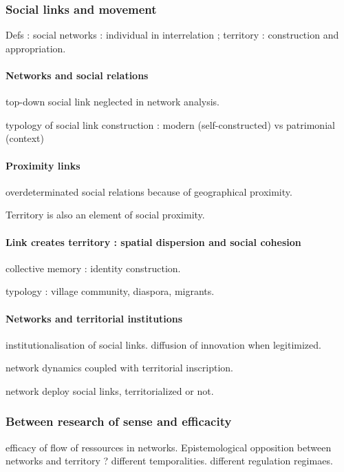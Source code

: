 \subsubsection*{Social links and movement}


Defs : social networks : individual in interrelation ; territory : construction and appropriation.

\paragraph{Networks and social relations}

top-down social link neglected in network analysis.

typology of social link construction : modern (self-constructed) vs patrimonial (context)

\paragraph{Proximity links}

overdeterminated social relations because of geographical proximity. 

Territory is also an element of social proximity.

\paragraph{Link creates territory : spatial dispersion and social cohesion}

collective memory : identity construction.

typology : village community, diaspora, migrants.

\paragraph{Networks and territorial institutions}


institutionalisation of social links. diffusion of innovation when legitimized.

network dynamics coupled with territorial inscription.

network deploy social links, territorialized or not.


\subsubsection*{Between research of sense and efficacity}

efficacy of flow of ressources in networks. Epistemological opposition between networks and territory ? different temporalities. different regulation regimaes.

